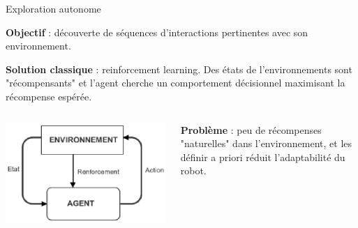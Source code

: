 \documentclass[xcolor=pst,dvips,12pt,english,french]{beamer}
\begin{document}
	\begin{frame}{Exploration autonome}
		
		\begin{block}{}
			\textbf{Objectif} : découverte de séquences d'interactions pertinentes avec son environnement.
		\end{block}
		\begin{exampleblock}{}
			\textbf{Solution classique} : reinforcement learning. Des états de l'environnements sont "récompensants" et l'agent cherche un comportement décisionnel maximisant la récompense espérée.
		\end{exampleblock}
		\begin{columns}
			\begin{column}{0.4\textwidth}
				\centering
				\includegraphics[width=\textwidth, trim={0 0 1cm 0, clip}]{images/RL1.eps}
			\end{column}
			\begin{column}{0.5\textwidth}
				\begin{alertblock}{}
					\textbf{Problème} : peu de récompenses "naturelles" dans l'environnement, et les définir a priori réduit l'adaptabilité du robot.
				\end{alertblock}
			\end{column}
		\end{columns}
		\vfill
		\tiny

	\end{frame}
	
\end{document}
